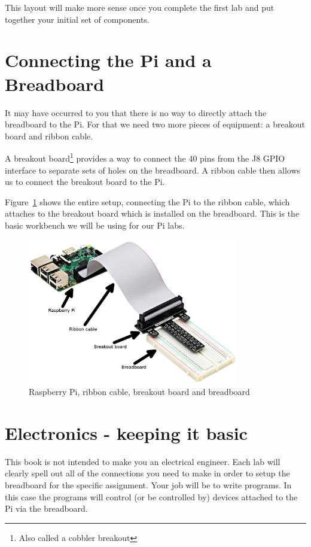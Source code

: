 This layout will make more sense once you complete the first lab 
and put together your initial set of components.

\section{Connecting the Pi and a Breadboard}

It may have occurred to you that there is no way to directly attach the breadboard to the Pi. For that we need two more pieces of equipment: a breakout board and ribbon cable.

A breakout board\footnote{Also called a cobbler breakout} provides a way to connect the 40 pins from the J8 GPIO interface to separate sets of holes on the breadboard. A ribbon cable then allows us to connect the breakout board to the Pi.

Figure~\ref{fig:piwithbreadboard} shows the entire setup, connecting the Pi to the ribbon cable, which attaches to the breakout board which is installed on the breadboard. This is the basic workbench we will be using for our Pi labs.

\begin{figure}[H]
	\centering
	\includegraphics[height=2.5in]{pi_images/breadboard-cobbler-pi.jpg}
	\caption{Raspberry Pi, ribbon cable, breakout board and breadboard}
	\label{fig:piwithbreadboard}
\end{figure}

\section{Electronics - keeping it basic}

This book is not intended to make you an electrical engineer. Each lab will clearly spell out all of the 
connections you need to make in order to setup the 
breadboard for the specific assignment. Your job will be
to write programs. In this case the programs will control
(or be controlled by) devices attached to the Pi via the breadboard.

